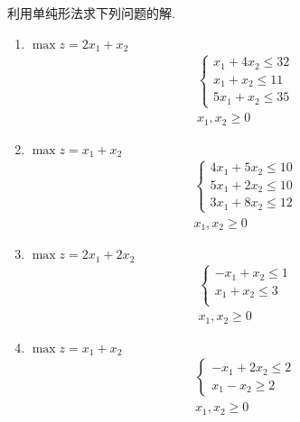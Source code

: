 利用单纯形法求下列问题的解.
\begin{enumerate}
    \item 
    $\max z = 2x_1+x_2$
    \begin{align*}
        \begin{cases}
            x_1 + 4x_2 \le 32\\
            x_1 + x_2 \le 11\\
            5x_1 + x_2 \le 35
        \end{cases}\\
        x_1,x_2 \ge 0
    \end{align*}
    \item 
    $\max z = x_1+x_2$
    \begin{align*}
        \begin{cases}
            4x_1 + 5x_2 \le 10\\
            5x_1 + 2x_2 \le 10\\
            3x_1 + 8x_2 \le 12
        \end{cases}\\
        x_1,x_2 \ge 0
    \end{align*}
    \item 
    $\max z = 2x_1+2x_2$
    \begin{align*}
        \begin{cases}
            -x_1 + x_2 \le 1\\
            x_1 + x_2 \le 3\\
        \end{cases}\\
        x_1,x_2 \ge 0
    \end{align*}
    \item 
    $\max z = x_1+x_2$
    \begin{align*}
        \begin{cases}
            -x_1 + 2x_2 \le 2\\
            x_1 - x_2 \ge 2
        \end{cases}\\
        x_1,x_2 \ge 0
    \end{align*}
\end{enumerate}